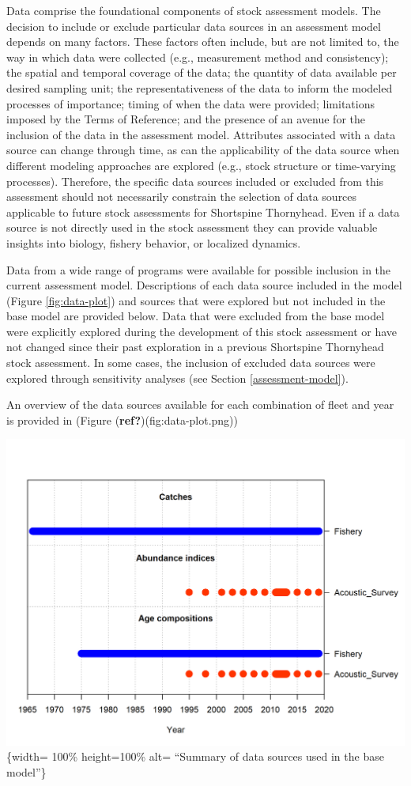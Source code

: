 \documentclass[11pt,
  english,
  letterpaper,
]{article}
\begin{document}
Data comprise the foundational components of stock assessment models. The decision to include or exclude particular data sources in an assessment model depends on many factors. These factors often include, but are not limited to, the way in which data were collected (e.g., measurement method and consistency); the spatial and temporal coverage of the data; the quantity of data available per desired sampling unit; the representativeness of the data to inform the modeled processes of importance; timing of when the data were provided; limitations imposed by the Terms of Reference; and the presence of an avenue for the inclusion of the data in the assessment model. Attributes associated with a data source can change through time, as can the applicability of the data source when different modeling approaches are explored (e.g., stock structure or time-varying processes). Therefore, the specific data sources included or excluded from this assessment should not necessarily constrain the selection of data sources applicable to future stock assessments for Shortspine Thornyhead. Even if a data source is not directly used in the stock assessment they can provide valuable insights into biology, fishery behavior, or localized dynamics.

Data from a wide range of programs were available for possible inclusion in the current assessment model. Descriptions of each data source included in the model (Figure \ref{fig:data-plot}) and sources that were explored but not included in the base model are provided below. Data that were excluded from the base model were explicitly explored during the development of this stock assessment or have not changed since their past exploration in a previous Shortspine Thornyhead stock assessment. In some cases, the inclusion of excluded data sources were explored through sensitivity analyses (see Section \ref{assessment-model}).

An overview of the data sources available for each combination of fleet and year is provided in (Figure \textbar{}(\textbf{ref?})(fig:data-plot.png))

\includegraphics{data-plot.png}\{width= 100\% height=100\% alt= ``Summary of data sources used in the base model''\}
\end{document}
